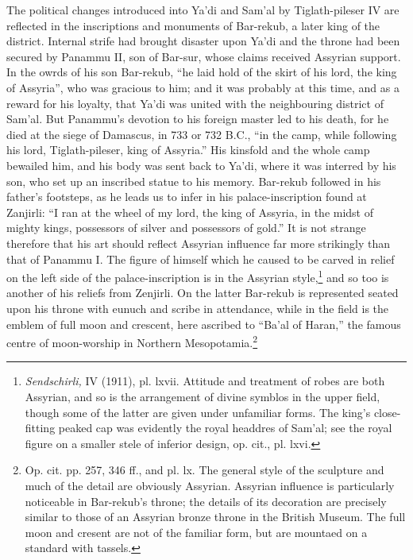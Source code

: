 \documentclass[12pt,oneside]{book}
\begin{document}
The political changes introduced into Ya'di and Sam'al by Tiglath-pileser IV are reflected in the inscriptions and monuments of Bar-rekub, a later king of the district. Internal strife had brought disaster upon Ya'di and the throne had been secured by Panammu II, son of Bar-sur, whose claims received Assyrian support. In the owrds of his son Bar-rekub, ``he laid hold of the skirt of his lord, the king of Assyria'', who was gracious to him; and it was probably at this time, and as a reward for his loyalty, that Ya'di was united with the neighbouring district of Sam'al. But Panammu's devotion to his foreign master led to his death, for he died at the siege of Damascus, in 733 or 732 B.C., ``in the camp, while following his lord, Tiglath-pileser, king of Assyria.'' His kinsfold and the whole camp bewailed him, and his body was sent back to Ya'di, where it was interred by his son, who set up an inscribed statue to his memory. Bar-rekub followed in his father's footsteps, as he leads us to infer in his palace-inscription found at Zanjirli: ``I ran at the wheel of my lord, the king of Assyria, in the midst of mighty kings, possessors of silver and possessors of gold.'' It is not strange therefore that his art should reflect Assyrian influence far more strikingly than that of Panammu I. The figure of himself which he caused to be carved in relief on the left side of the palace-inscription is in the Assyrian style,\footnote{\textit{Sendschirli,} IV (1911), pl. lxvii. Attitude and treatment of robes are both Assyrian, and so is the arrangement of divine symblos in the upper field, though some of the latter are given under unfamiliar forms. The king's close-fitting peaked cap was evidently the royal headdres of Sam'al; see the royal figure on a smaller stele of inferior design, op. cit., pl. lxvi.} and so too is another of his reliefs from Zenjirli. On the latter Bar-rekub is represented seated upon his throne with eunuch and scribe in attendance, while in the field is the emblem of full moon and crescent, here ascribed to ``Ba'al of Haran,'' the famous centre of moon-worship in Northern Mesopotamia.\footnote{Op. cit. pp. 257, 346 ff., and pl. lx. The general style of the sculpture and much of the detail are obviously Assyrian. Assyrian influence is particularly noticeable in Bar-rekub's throne; the details of its decoration are precisely similar to those of an Assyrian bronze throne in the British Museum. The full moon and cresent are not of the familiar form, but are mountaed on a standard with tassels.} \par 
\end{document}
